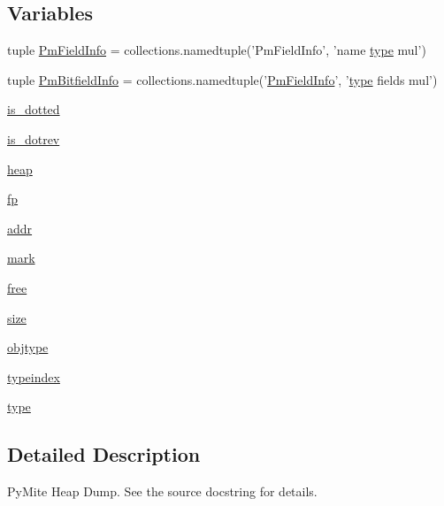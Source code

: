 \subsection*{Variables}
\begin{DoxyCompactItemize}
\item 
tuple \hyperlink{namespacepm_heap_dump_ade357f2e7bd34472fdd0c07419840466}{Pm\-Field\-Info} = collections.\-namedtuple('Pm\-Field\-Info', 'name \hyperlink{namespacepm_heap_dump_aeb34dbe495a159e197a5ee34718626d0}{type} mul')
\item 
tuple \hyperlink{namespacepm_heap_dump_a8831e21f0c2e277f36a27a627e771251}{Pm\-Bitfield\-Info} = collections.\-namedtuple('\hyperlink{namespacepm_heap_dump_ade357f2e7bd34472fdd0c07419840466}{Pm\-Field\-Info}', '\hyperlink{namespacepm_heap_dump_aeb34dbe495a159e197a5ee34718626d0}{type} fields mul')
\item 
\hyperlink{namespacepm_heap_dump_a1ac63bf4b6f96fcf998f80241d725b0d}{is\-\_\-dotted}
\item 
\hyperlink{namespacepm_heap_dump_a6f9a7057f35e4683fef5fc0b7a207ae0}{is\-\_\-dotrev}
\item 
\hyperlink{namespacepm_heap_dump_afb77168fd59f79c92bbe0ea31f8aa949}{heap}
\item 
\hyperlink{namespacepm_heap_dump_ab477e371d9c3ece133b48c71871ad8f3}{fp}
\item 
\hyperlink{namespacepm_heap_dump_a18abce4c123c5eaa0e33bce572b198b2}{addr}
\item 
\hyperlink{namespacepm_heap_dump_a44db4bf4dd96792fae3cc43a15936775}{mark}
\item 
\hyperlink{namespacepm_heap_dump_a8eb42273482f3108f8277cde5d915452}{free}
\item 
\hyperlink{namespacepm_heap_dump_a179cfd1626c5dad2c2485952a23c4995}{size}
\item 
\hyperlink{namespacepm_heap_dump_a0be8bf70a7f9c16e5457936ad066f381}{objtype}
\item 
\hyperlink{namespacepm_heap_dump_ae082893f5b955b3bd5e454b551517363}{typeindex}
\item 
\hyperlink{namespacepm_heap_dump_aeb34dbe495a159e197a5ee34718626d0}{type}
\end{DoxyCompactItemize}


\subsection{Detailed Description}
Py\-Mite Heap Dump. See the source docstring for details. 

